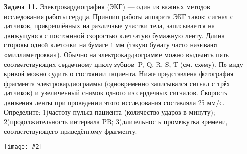 \documentclass{article}
\newcommand{\pdtpb}[2]{
	\par
	\begin{minipage}{.95\linewidth}
	\setlength{\parindent}{2em}
	{#1}
	\end{minipage}
	\linebreak
	\begin{minipage}{.95\linewidth}
	{\texttt{[image: \#2]}}
	\end{minipage}
	\linebreak
}
\begin{document}
\pdtpb{\Large\textbf{Задача 11.}
{Электрокардиография (ЭКГ) — один из важных методов исследования работы сердца. Принцип работы аппарата ЭКГ таков: сигнал с датчиков, прикреплённых на различные участки тела, записывается на движущуюся с постоянной скоростью клетчатую бумажную ленту. Длина стороны одной клеточки на бумаге 1 мм (такую бумагу часто называют «миллиметровка»). Обычно на электрокардиограмме можно выделить пять соответствующих сердечному циклу зубцов: P, Q, R, S, T (см. схему). По виду кривой можно судить о состоянии пациента.
Ниже представлена фотография фрагмента электрокардиограммы (одновременно записывался сигнал с трёх датчиков) и увеличенный снимок одного из сердечных сигналов. Скорость движения ленты при проведении этого исследования составляла 25 мм/с. Определите:
1)частоту пульса пациента (количество ударов в минуту);
2)продолжительность интервала PR;
3)длительность промежутка времени, соответствующего приведённому фрагменту.}
}
{ECG.png}



\end{document}
